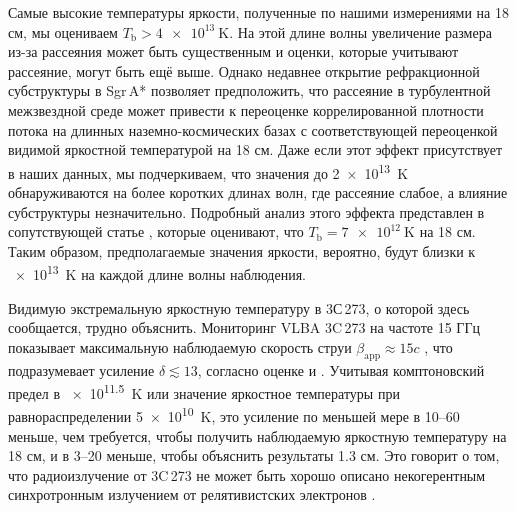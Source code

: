 Самые высокие температуры яркости, полученные по нашими измерениями на 18 см, мы оцениваем
$T_\text{b} > \SI{4e13}{\kelvin}$. На этой длине волны увеличение размера из-за рассеяния может быть
существенным и оценки, которые учитывают рассеяние, могут быть ещё выше. Однако недавнее открытие
рефракционной субструктуры в Sgr\,A* \cite{Gwinn_2014} позволяет предположить, что рассеяние в
турбулентной межзвездной среде может привести к переоценке коррелированной плотности потока на
длинных наземно-космических базах с соответствующей переоценкой видимой яркостной температурой
\cite{Johnson_2015} на 18 см. Даже если этот эффект присутствует в наших данных, мы подчеркиваем,
что значения до \SI{2e13}{\kelvin} обнаруживаются на более коротких длинах волн, где рассеяние
слабое, а влияние субструктуры незначительно. Подробный анализ этого эффекта представлен в
сопутствующей статье \cite{Johnson_2016}, которые оценивают, что $T_\text{b} = \SI{7e12}{\kelvin}$
на 18 см. Таким образом, предполагаемые значения яркости, вероятно, будут близки к \SI{e13}{\kelvin}
на каждой длине волны наблюдения.

Видимую экстремальную яркостную температуру в 3С\,273, о которой здесь сообщается, трудно объяснить.
Мониторинг VLBA 3C\,273 на частоте 15 ГГц показывает максимальную наблюдаемую скорость струи
$\beta_\text{app} \approx 15c$ \cite{Lister_2013}, что подразумевает усиление $\delta \lesssim 13$,
согласно оценке \cite{Jorstad_2005} и \cite{Savolainen_2010}. Учитывая комптоновский предел в
\SI{e11.5}{\kelvin} или значение яркостное температуры при равнораспределении \SI{5e10}{\kelvin},
это усиление по меньшей мере в 10--60 меньше, чем требуется, чтобы получить наблюдаемую яркостную
температуру на 18 см, и в 3--20 меньше, чтобы объяснить результаты 1.3 см. Это говорит о том, что
радиоизлучение от 3C\,273 не может быть хорошо описано некогерентным синхротронным излучением от
релятивистских электронов \cite{Kardashev_2000}.

